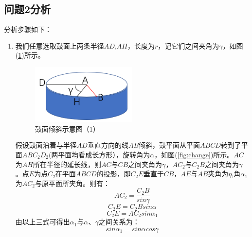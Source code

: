 \documentclass{cumcm}
\begin{document}
\subsection{问题2分析}
分析步骤如下：
\begin{enumerate}
\item 我们任意选取鼓面上两条半径$AD$,$AH$，长度为$r$，记它们之间夹角为$\gamma$，如图(\ref{figcircle})所示。
\begin{figure}[H]
\centering
\includegraphics[width=0.5\textwidth]{img/circle.png}
\caption{鼓面倾斜示意图（1）}\label{figcircle}
\end{figure}
\quad \quad
假设鼓面沿着与半径$AD$垂直方向的线$AB$倾斜，鼓平面从平面$ABCD$转到了平面$ABC_2D_2$(两平面均看成长方形），旋转角为$\alpha$，如图(\ref{fig:change})所示。$AC$为$AH$所在半径的延长线，则$AC$与$CB$之间夹角为$\gamma$，$AC_2$与$C_2B$之间夹角为$\gamma$。点$E$为点$C_2$在平面$ABCD$的投影，即$C_2E$垂直于$CB$，$AE$与$AB$夹角为$\eta$,角$\alpha_1$为$AC_2$与原平面所夹角。则有：\\
\begin{displaymath}
AC_2=\frac{C_2B}{sin\gamma}
\end{displaymath}
\begin{displaymath}
C_2E=C_2Bsin\alpha
\end{displaymath}
\begin{displaymath}
C_2E=AC_2sin\alpha_1
\end{displaymath}
由以上三式可得出$\alpha_1$与$\alpha$、$\gamma$之间关系为：
\begin{equation}
sin\alpha_1=sin\alpha cos\gamma
\end{equation}


\end{enumerate}
\end{document}
